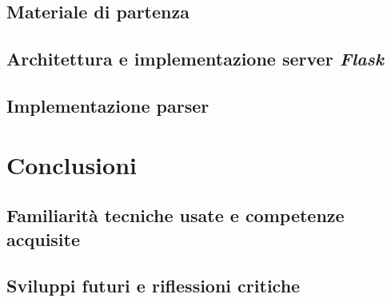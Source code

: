 \documentclass[12pt]{report}
\newcommand{\flask}{\textsl{Flask}\xspace}
\begin{document}
\section{Materiale di partenza}
\section{Architettura e implementazione server \flask}
\section{Implementazione parser}


\chapter{Conclusioni}
\section{Familiarità tecniche usate e competenze acquisite}
\section{Sviluppi futuri e riflessioni critiche}
\end{document}
